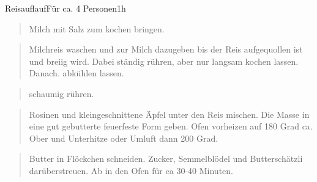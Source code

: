 \documentclass[
  a4paper,
]{article}
\begin{document}
\begin{recipe}{Reisauflauf}{Für ca. 4 Personen}{1h}


\begin{quote}
Milch mit Salz zum kochen bringen.
\end{quote}

\freeform\hrulefill


\begin{quote}
Milchreis waschen und zur Milch dazugeben bis der Reis aufgequollen ist
und breiig wird. Dabei ständig rühren, aber nur langsam kochen lassen.
Danach. abkühlen lassen.
\end{quote}

\freeform\hrulefill


\begin{quote}
schaumig rühren.
\end{quote}

\freeform\hrulefill


\begin{quote}
Rosinen und kleingeschnittene Äpfel unter den Reis mischen. Die Masse in
eine gut gebutterte feuerfeste Form geben. Ofen vorheizen auf 180 Grad
ca. Ober und Unterhitze oder Umluft dann 200 Grad.
\end{quote}

\freeform\hrulefill


\begin{quote}
Butter in Flöckchen schneiden. Zucker, Semmelblödel und Butterschätzli
darüberstreuen. Ab in den Ofen für ca 30-40 Minuten.
\end{quote}

\freeform\hrulefill\newline{}\end{recipe}

\newpage
\end{document}
